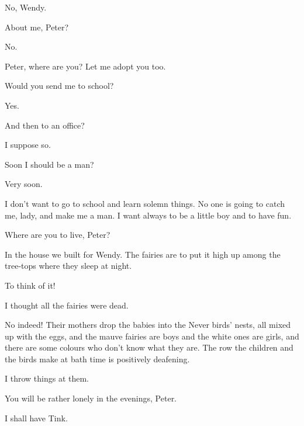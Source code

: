 \begin{drama}
\peterspeaks
No, Wendy.

\wendyspeaks
About me, Peter?

\peterspeaks
No.

Peter, where are you?
Let me adopt you too.


\peterspeaks
Would you send me to school?

Yes.

\peterspeaks
And then to an office?

\mrsdarlingspeaks
I suppose so.

\peterspeaks
Soon I should be a man?

\mrsdarlingspeaks
Very soon.

I don’t want to go to school and learn solemn things.
No one is going to catch me, lady, and make me a man.
I want always to be a little boy and to have fun.


Where are you to live, Peter?

\peterspeaks
In the house we built for Wendy.
The fairies are to put it high up among the tree‐tops where they sleep at night.

To think of it!

\mrsdarlingspeaks
I thought all the fairies were dead.

No indeed!
Their mothers drop the babies into the Never birds’ nests, all mixed up with the eggs,
and the mauve fairies are boys and the white ones are girls,
and there are some colours who don’t know what they are.
The row the children and the birds make at bath time is positively deafening.

\peterspeaks
I throw things at them.

\wendyspeaks
You will be rather lonely in the evenings, Peter.

\peterspeaks
I shall have Tink.


\end{drama}
